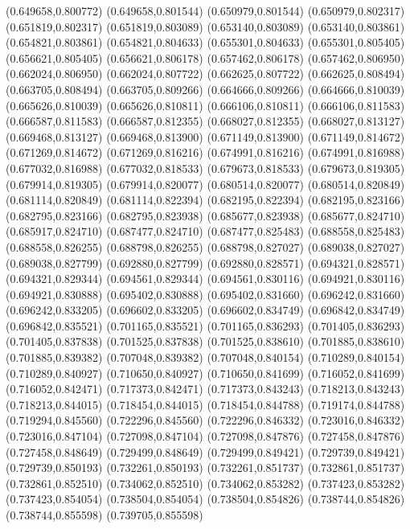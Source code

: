 (0.649658,0.800772)
(0.649658,0.801544)
(0.650979,0.801544)
(0.650979,0.802317)
(0.651819,0.802317)
(0.651819,0.803089)
(0.653140,0.803089)
(0.653140,0.803861)
(0.654821,0.803861)
(0.654821,0.804633)
(0.655301,0.804633)
(0.655301,0.805405)
(0.656621,0.805405)
(0.656621,0.806178)
(0.657462,0.806178)
(0.657462,0.806950)
(0.662024,0.806950)
(0.662024,0.807722)
(0.662625,0.807722)
(0.662625,0.808494)
(0.663705,0.808494)
(0.663705,0.809266)
(0.664666,0.809266)
(0.664666,0.810039)
(0.665626,0.810039)
(0.665626,0.810811)
(0.666106,0.810811)
(0.666106,0.811583)
(0.666587,0.811583)
(0.666587,0.812355)
(0.668027,0.812355)
(0.668027,0.813127)
(0.669468,0.813127)
(0.669468,0.813900)
(0.671149,0.813900)
(0.671149,0.814672)
(0.671269,0.814672)
(0.671269,0.816216)
(0.674991,0.816216)
(0.674991,0.816988)
(0.677032,0.816988)
(0.677032,0.818533)
(0.679673,0.818533)
(0.679673,0.819305)
(0.679914,0.819305)
(0.679914,0.820077)
(0.680514,0.820077)
(0.680514,0.820849)
(0.681114,0.820849)
(0.681114,0.822394)
(0.682195,0.822394)
(0.682195,0.823166)
(0.682795,0.823166)
(0.682795,0.823938)
(0.685677,0.823938)
(0.685677,0.824710)
(0.685917,0.824710)
(0.687477,0.824710)
(0.687477,0.825483)
(0.688558,0.825483)
(0.688558,0.826255)
(0.688798,0.826255)
(0.688798,0.827027)
(0.689038,0.827027)
(0.689038,0.827799)
(0.692880,0.827799)
(0.692880,0.828571)
(0.694321,0.828571)
(0.694321,0.829344)
(0.694561,0.829344)
(0.694561,0.830116)
(0.694921,0.830116)
(0.694921,0.830888)
(0.695402,0.830888)
(0.695402,0.831660)
(0.696242,0.831660)
(0.696242,0.833205)
(0.696602,0.833205)
(0.696602,0.834749)
(0.696842,0.834749)
(0.696842,0.835521)
(0.701165,0.835521)
(0.701165,0.836293)
(0.701405,0.836293)
(0.701405,0.837838)
(0.701525,0.837838)
(0.701525,0.838610)
(0.701885,0.838610)
(0.701885,0.839382)
(0.707048,0.839382)
(0.707048,0.840154)
(0.710289,0.840154)
(0.710289,0.840927)
(0.710650,0.840927)
(0.710650,0.841699)
(0.716052,0.841699)
(0.716052,0.842471)
(0.717373,0.842471)
(0.717373,0.843243)
(0.718213,0.843243)
(0.718213,0.844015)
(0.718454,0.844015)
(0.718454,0.844788)
(0.719174,0.844788)
(0.719294,0.845560)
(0.722296,0.845560)
(0.722296,0.846332)
(0.723016,0.846332)
(0.723016,0.847104)
(0.727098,0.847104)
(0.727098,0.847876)
(0.727458,0.847876)
(0.727458,0.848649)
(0.729499,0.848649)
(0.729499,0.849421)
(0.729739,0.849421)
(0.729739,0.850193)
(0.732261,0.850193)
(0.732261,0.851737)
(0.732861,0.851737)
(0.732861,0.852510)
(0.734062,0.852510)
(0.734062,0.853282)
(0.737423,0.853282)
(0.737423,0.854054)
(0.738504,0.854054)
(0.738504,0.854826)
(0.738744,0.854826)
(0.738744,0.855598)
(0.739705,0.855598)
